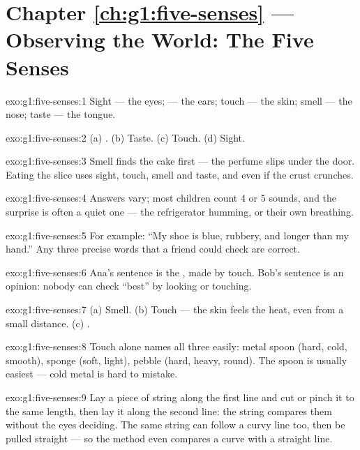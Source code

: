 \section*{Chapter \ref{ch:g1:five-senses} --- Observing the World: The Five Senses}

\begin{solution}{exo:g1:five-senses:1}
Sight --- the eyes;  --- the ears; touch --- the skin; smell
--- the nose; taste --- the tongue.
\end{solution}

\begin{solution}{exo:g1:five-senses:2}
(a) . (b) Taste. (c) Touch. (d) Sight.
\end{solution}

\begin{solution}{exo:g1:five-senses:3}
Smell finds the cake first --- the perfume slips under the door.
Eating the slice uses sight, touch, smell and taste, and even 
if the crust crunches.
\end{solution}

\begin{solution}{exo:g1:five-senses:4}
Answers vary; most children count $4$ or $5$ sounds, and the surprise
is often a quiet one --- the refrigerator humming, or their own
breathing.
\end{solution}

\begin{solution}{exo:g1:five-senses:5}
For example: ``My shoe is blue, rubbery, and longer than my hand.''
Any three precise words that a friend could check are correct.
\end{solution}

\begin{solution}{exo:g1:five-senses:6}
Ana's sentence is the , made by touch. Bob's sentence is
an opinion: nobody can check ``best'' by looking or touching.
\end{solution}

\begin{solution}{exo:g1:five-senses:7}
(a) Smell. (b) Touch --- the skin feels the heat, even from a small
distance. (c) .
\end{solution}

\begin{solution}{exo:g1:five-senses:8}
Touch alone names all three easily: metal spoon (hard, cold, smooth),
sponge (soft, light), pebble (hard, heavy, round). The spoon is
usually easiest --- cold metal is hard to mistake.
\end{solution}

\begin{solution}{exo:g1:five-senses:9}
Lay a piece of string along the first line and cut or pinch it to the
same length, then lay it along the second line: the string compares
them without the eyes deciding. The same string can follow a curvy
line too, then be pulled straight --- so the method even compares a
curve with a straight line.
\end{solution}
